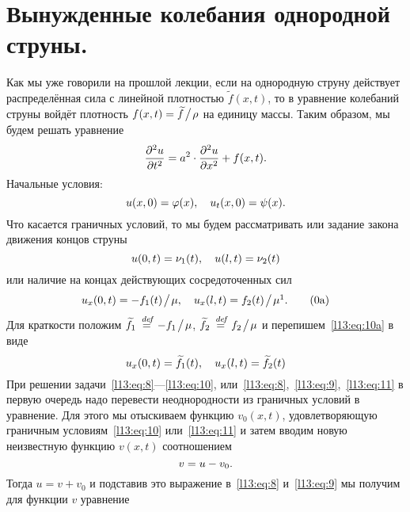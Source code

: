 \documentclass[12pt,a4paper,openany,fleqn]{book}
\newcommand {\defeq}{\stackrel{\hspace{0.09 cm}de\!f}{=}}
\newcommand {\eqdef}{\defeq}
\newcommand{\pdder}[2]{\ensuremath{\frac{\partial^2#1}{\partial#2^2}}}
\theoremstyle{definition}
\begin{document}
	\section{Вынужденные колебания однородной струны.}
	\label{lecture13section2}
	Как мы уже говорили на прошлой лекции, если на однородную струну действует распределённая сила с линейной плотностью $\widetilde{f}(x,t)$, то в уравнение колебаний струны войдёт плотность $f(x,t)=\widetilde{f}\!\bigm/\!\rho$ на единицу массы. Таким образом, мы будем решать уравнение 
	\begin{equation}\label{l13:eq:8}
		\hfill\pdder{u}{t}=a^2\cdot\pdder{u}{x}+f(x,t).\hfill
	\end{equation}
	Начальные условия:
	\begin{equation}\label{l13:eq:9}
		\hfill u(x,0)=\phi(x),\quad u_t(x,0)=\psi(x).\hfill
	\end{equation}
	Что касается граничных условий, то мы будем рассматривать или задание закона движения концов струны
	\begin{equation}\label{l13:eq:10}
		\hfill u(0,t)=\nu_1(t),\quad u(l,t)=\nu_2(t)\hfill
	\end{equation}
	или наличие на концах действующих сосредоточенных сил
	\begin{equation}\label{l13:eq:10a}
		\hfill u_x(0,t)=-f_1(t)\!\bigm/\!\mu,\quad u_x(l,t)=f_2(t)\!\bigm/\!\mu\footnotemark{}.\hfill\tag{\theequation a}
	\end{equation} Для краткости положим $\widetilde{f}_1\eqdef -f_1\!\bigm/\!\mu$, $\widetilde{f}_2\eqdef f_2\!\bigm/\!\mu$ и перепишем~\eqref{l13:eq:10a} в виде
	\begin{equation}\label{l13:eq:11}
		\hfill u_x(0,t)=\widetilde{f}_1(t),\quad u_x(l,t)=\widetilde{f}_2(t)\hfill
	\end{equation}
	При решении задачи~\eqref{l13:eq:8}---\eqref{l13:eq:10}, или~\eqref{l13:eq:8},~\eqref{l13:eq:9},~\eqref{l13:eq:11} в первую очередь надо перевести неоднородности из граничных условий в уравнение. Для этого мы отыскиваем функцию $v_0(x,t)$, удовлетворяющую граничным условиям~\eqref{l13:eq:10} или~\eqref{l13:eq:11}  и затем вводим новую неизвестную функцию $v(x,t)$ соотношением 
	\begin{equation*}
		\hfill v=u-v_0.\hfill
	\end{equation*}  
	Тогда $u=v+v_0$ и подставив это выражение в~\eqref{l13:eq:8} и~\eqref{l13:eq:9} мы получим для функции $v$ уравнение 
\end{document}

